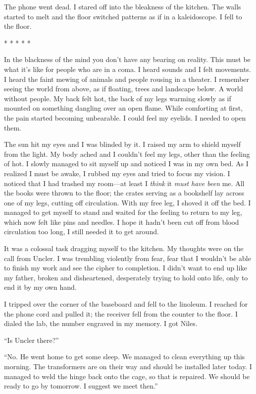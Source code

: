 The phone went dead. I stared off into the bleakness of the kitchen. The
walls started to melt and the floor switched patterns as if in a
kaleidoscope. I fell to the floor.

* * * * *

In the blackness of the mind you don't have any bearing on reality. This
must be what it's like for people who are in a coma. I heard sounds and
I felt movements. I heard the faint mewing of animals and people rousing
in a theater. I remember seeing the world from above, as if floating,
trees and landscape below. A world without people. My back felt hot, the
back of my legs warming slowly as if mounted on something dangling over
an open flame. While comforting at first, the pain started becoming
unbearable. I could feel my eyelids. I needed to open them.

The sun hit my eyes and I was blinded by it. I raised my arm to shield
myself from the light. My body ached and I couldn't feel my legs, other
than the feeling of hot. I slowly managed to sit myself up and noticed I
was in my own bed. As I realized I must be awake, I rubbed my eyes and
tried to focus my vision. I noticed that I had trashed my room---at
least I \emph{think} it \emph{must have been} me. All the books were
thrown to the floor; the crates serving as a bookshelf lay across one of
my legs, cutting off circulation. With my free leg, I shoved it off the
bed. I managed to get myself to stand and waited for the feeling to
return to my leg, which now felt like pins and needles. I hope it hadn't
been cut off from blood circulation too long, I still needed it to get
around.

It was a colossal task dragging myself to the kitchen. My thoughts were
on the call from Uncler. I was trembling violently from fear, fear that
I wouldn't be able to finish my work and see the cipher to completion. I
didn't want to end up like my father, broken and disheartened,
desperately trying to hold onto life, only to end it by my own hand.

I tripped over the corner of the baseboard and fell to the linoleum. I
reached for the phone cord and pulled it; the receiver fell from the
counter to the floor. I dialed the lab, the number engraved in my
memory. I got Niles.

``Is Uncler there?''

``No. He went home to get some sleep. We managed to clean everything up
this morning. The transformers are on their way and should be installed
later today. I managed to weld the hinge back onto the cage, so that is
repaired. We should be ready to go by tomorrow. I suggest we meet
then.''

